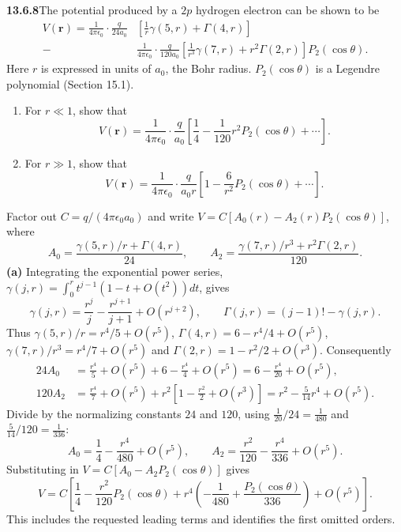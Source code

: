 \par\bigskip
\noindent\textbf{13.6.8}\quad The potential produced by a $2p$ hydrogen
electron can be shown to be
\begin{align*}
V(\mathbf{r})=\frac{1}{4\pi\epsilon_{0}}\cdot\frac{q}{24a_{0}}
&\left[\frac{1}{r}\gamma(5,r)+\Gamma(4,r)\right]\\
-&\frac{1}{4\pi\epsilon_{0}}\cdot\frac{q}{120a_{0}}
\left[\frac{1}{r^{3}}\gamma(7,r)+r^{2}\Gamma(2,r)\right]P_{2}(\cos\theta).
\end{align*}
Here $r$ is expressed in units of $a_{0}$, the Bohr radius. $P_{2}(\cos\theta)$
is a Legendre polynomial (Section 15.1).
\begin{enumerate}
\item[(a)] For $r\ll1$, show that
  \[
  V(\mathbf{r})=\frac{1}{4\pi\epsilon_{0}}\cdot\frac{q}{a_{0}}
  \left[\frac{1}{4}-\frac{1}{120}r^{2}P_{2}(\cos\theta)+\cdots\right].
  \]
\item[(b)] For $r\gg1$, show that
  \[
  V(\mathbf{r})=\frac{1}{4\pi\epsilon_{0}}\cdot\frac{q}{a_{0}r}
  \left[1-\frac{6}{r^{2}}P_{2}(\cos\theta)+\cdots\right].
  \]
\end{enumerate}
\solution
Factor out $C=q/(4\pi\epsilon_0a_0)$ and write
$V=C[A_0(r)-A_2(r)P_2(\cos\theta)]$, where
\[
A_0=\frac{\gamma(5,r)/r+\Gamma(4,r)}{24},
\qquad
A_2=\frac{\gamma(7,r)/r^3+r^2\Gamma(2,r)}{120}.
\]
\textbf{(a)} Integrating the exponential power series,
$\gamma(j,r)=\int_0^rt^{j-1}(1-t+O(t^2))dt$, gives
\[
\gamma(j,r)=\frac{r^j}{j}-\frac{r^{j+1}}{j+1}+O(r^{j+2}),
\qquad\Gamma(j,r)=(j-1)!-\gamma(j,r).
\]
Thus $\gamma(5,r)/r=r^4/5+O(r^5)$, $\Gamma(4,r)=6-r^4/4+O(r^5)$,
$\gamma(7,r)/r^3=r^4/7+O(r^5)$ and $\Gamma(2,r)=1-r^2/2+O(r^3)$.
Consequently
\begin{align*}
24A_0&=\frac{r^4}{5}+O(r^5)+6-\frac{r^4}{4}+O(r^5)
=6-\frac{r^4}{20}+O(r^5),\\
120A_2&=\frac{r^4}{7}+O(r^5)
+r^2\left[1-\frac{r^2}{2}+O(r^3)\right]
=r^2-\frac5{14}r^4+O(r^5).
\end{align*}
Divide by the normalizing constants $24$ and $120$, using
$\frac1{20}\big/24=\frac1{480}$ and $\frac5{14}\big/120=\frac1{336}$:
\[
A_0=\frac14-\frac{r^4}{480}+O(r^5),\qquad
A_2=\frac{r^2}{120}-\frac{r^4}{336}+O(r^5).
\]
Substituting in $V=C[A_0-A_2P_2(\cos\theta)]$ gives
\[
\boxed{V=C\left[\frac14-\frac{r^2}{120}P_2(\cos\theta)
+r^4\left(-\frac1{480}+\frac{P_2(\cos\theta)}{336}\right)
+O(r^5)\right]}.
\]
This includes the requested leading terms and identifies the
first omitted orders.

